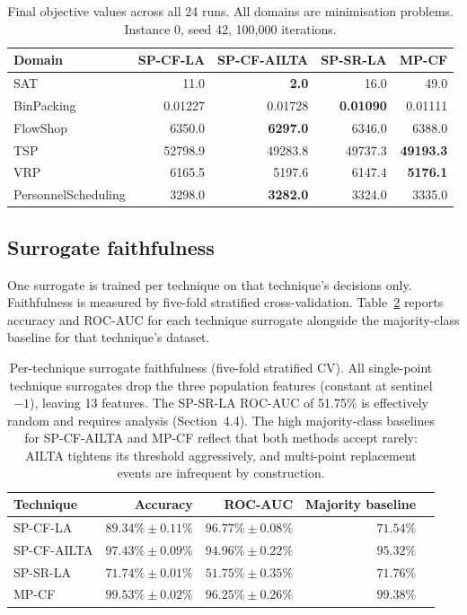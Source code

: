 \documentclass[11pt,a4paper]{article}
\begin{document}
\begin{table}[h]
\centering
\begin{tabular}{lrrrr}
\toprule
Domain & SP-CF-LA & SP-CF-AILTA & SP-SR-LA & MP-CF \\
\midrule
SAT                 & 11.0       & \textbf{2.0}    & 16.0       & 49.0 \\
BinPacking          & 0.01227    & 0.01728         & \textbf{0.01090}    & 0.01111 \\
FlowShop            & 6350.0     & \textbf{6297.0} & 6346.0     & 6388.0 \\
TSP                 & 52798.9    & 49283.8         & 49737.3    & \textbf{49193.3} \\
VRP                 & 6165.5     & 5197.6          & 6147.4     & \textbf{5176.1} \\
PersonnelScheduling & 3298.0     & \textbf{3282.0} & 3324.0     & 3335.0 \\
\bottomrule
\end{tabular}
\caption{Final objective values across all 24 runs. All domains are minimisation
problems. Instance 0, seed 42, 100,000 iterations.}
\label{tab:objectives}
\end{table}

\subsection{Surrogate faithfulness}

One surrogate is trained per technique on that technique's decisions only. Faithfulness
is measured by five-fold stratified cross-validation. Table~\ref{tab:faithfulness}
reports accuracy and ROC-AUC for each technique surrogate alongside the majority-class
baseline for that technique's dataset.

\begin{table}[h]
\centering
\begin{tabular}{lrrrr}
\toprule
Technique & Accuracy & ROC-AUC & Majority baseline \\
\midrule
SP-CF-LA    & $89.34\% \pm 0.11\%$ & $96.77\% \pm 0.08\%$ & $71.54\%$ \\
SP-CF-AILTA & $97.43\% \pm 0.09\%$ & $94.96\% \pm 0.22\%$ & $95.32\%$ \\
SP-SR-LA    & $71.74\% \pm 0.01\%$ & $51.75\% \pm 0.35\%$ & $71.76\%$ \\
MP-CF       & $99.53\% \pm 0.02\%$ & $96.25\% \pm 0.26\%$ & $99.38\%$ \\
\bottomrule
\end{tabular}
\caption{Per-technique surrogate faithfulness (five-fold stratified CV). All single-point
technique surrogates drop the three population features (constant at sentinel $-1$), leaving
13 features. The SP-SR-LA ROC-AUC of 51.75\% is effectively random and requires analysis
(Section~4.4). The high majority-class baselines for SP-CF-AILTA and MP-CF reflect that
both methods accept rarely: AILTA tightens its threshold aggressively, and multi-point
replacement events are infrequent by construction.}
\label{tab:faithfulness}
\end{table}
\end{document}
